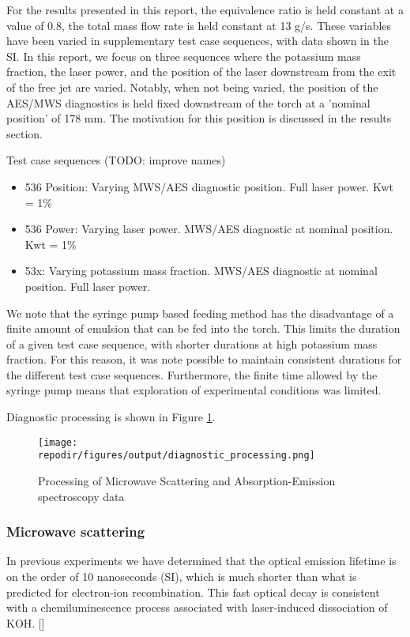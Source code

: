 For the results presented in this report, the equivalence ratio is held constant at a value of 0.8, the total mass flow rate is held constant at 13 g/s. These variables have been varied in supplementary test case sequences, with data shown in the SI. In this report, we focus on three sequences where the potassium mass fraction, the laser power, and the position of the laser downstream from the exit of the free jet are varied. Notably, when not being varied, the position of the AES/MWS diagnostics is held fixed downstream of the torch at a 'nominal position' of 178 mm. The motivation for this position is discussed in the results section. 

Test case sequences (TODO: improve names)
\begin{itemize}
    \item 536 Position: Varying MWS/AES diagnostic position. Full laser power. Kwt = 1\%
    \item 536 Power: Varying laser power. MWS/AES diagnostic at nominal position. Kwt = 1\%
    \item 53x: Varying potassium mass fraction. MWS/AES diagnostic at nominal position. Full laser power.
\end{itemize}



We note that the syringe pump based feeding method has the disadvantage of a finite amount of emulsion that can be fed into the torch. This limits the duration of a given test case sequence, with shorter durations at high potassium mass fraction. For this reason, it was note possible to maintain consistent durations for the different test case sequences. Furthermore, the finite time allowed by the syringe pump means that exploration of experimental conditions was limited. 


Diagnostic processing is shown in Figure \ref{fig:diagnostic_processing}.

\begin{figure}[h]
    \texttt{[image: \\repodir/figures/output/diagnostic\_processing.png]} 
    \caption{Processing of Microwave Scattering and Absorption-Emission spectroscopy data}
    \label{fig:diagnostic_processing}
\end{figure}


\subsubsection{Microwave scattering}

 In previous experiments we have determined that the optical emission lifetime is on the order of 10 nanoseconds (SI), which is much shorter than what is predicted for electron-ion recombination. This fast optical decay is consistent with a chemiluminescence process associated with laser-induced dissociation of KOH. [] 

